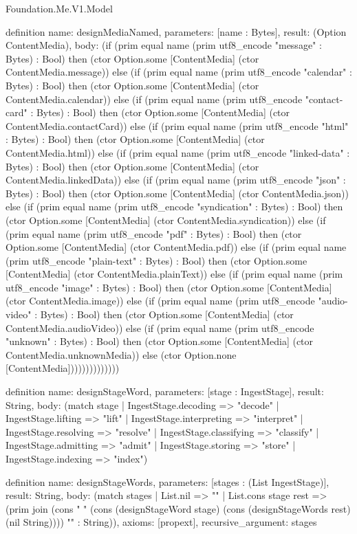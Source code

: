 \begin{lexlean}{Foundation.Me.V1.Model}
\begin{semanticmodule}
definition{
  name: designMediaNamed,
  parameters: [name : Bytes],
  result: (Option ContentMedia),
  body: (if (prim equal name (prim utf8_encode "message" : Bytes) : Bool) then (ctor Option.some [ContentMedia] (ctor ContentMedia.message)) else (if (prim equal name (prim utf8_encode "calendar" : Bytes) : Bool) then (ctor Option.some [ContentMedia] (ctor ContentMedia.calendar)) else (if (prim equal name (prim utf8_encode "contact-card" : Bytes) : Bool) then (ctor Option.some [ContentMedia] (ctor ContentMedia.contactCard)) else (if (prim equal name (prim utf8_encode "html" : Bytes) : Bool) then (ctor Option.some [ContentMedia] (ctor ContentMedia.html)) else (if (prim equal name (prim utf8_encode "linked-data" : Bytes) : Bool) then (ctor Option.some [ContentMedia] (ctor ContentMedia.linkedData)) else (if (prim equal name (prim utf8_encode "json" : Bytes) : Bool) then (ctor Option.some [ContentMedia] (ctor ContentMedia.json)) else (if (prim equal name (prim utf8_encode "syndication" : Bytes) : Bool) then (ctor Option.some [ContentMedia] (ctor ContentMedia.syndication)) else (if (prim equal name (prim utf8_encode "pdf" : Bytes) : Bool) then (ctor Option.some [ContentMedia] (ctor ContentMedia.pdf)) else (if (prim equal name (prim utf8_encode "plain-text" : Bytes) : Bool) then (ctor Option.some [ContentMedia] (ctor ContentMedia.plainText)) else (if (prim equal name (prim utf8_encode "image" : Bytes) : Bool) then (ctor Option.some [ContentMedia] (ctor ContentMedia.image)) else (if (prim equal name (prim utf8_encode "audio-video" : Bytes) : Bool) then (ctor Option.some [ContentMedia] (ctor ContentMedia.audioVideo)) else (if (prim equal name (prim utf8_encode "unknown" : Bytes) : Bool) then (ctor Option.some [ContentMedia] (ctor ContentMedia.unknownMedia)) else (ctor Option.none [ContentMedia])))))))))))))
}

definition{
  name: designStageWord,
  parameters: [stage : IngestStage],
  result: String,
  body: (match stage
    | IngestStage.decoding => "decode"
    | IngestStage.lifting => "lift"
    | IngestStage.interpreting => "interpret"
    | IngestStage.resolving => "resolve"
    | IngestStage.classifying => "classify"
    | IngestStage.admitting => "admit"
    | IngestStage.storing => "store"
    | IngestStage.indexing => "index")
}

definition{
  name: designStageWords,
  parameters: [stages : (List IngestStage)],
  result: String,
  body: (match stages
    | List.nil => ""
    | List.cons stage rest => (prim join (cons " " (cons (designStageWord stage) (cons (designStageWords rest) (nil String)))) "" : String)),
  axioms: [propext],
  recursive_argument: stages
}


\end{semanticmodule}
\end{lexlean}
